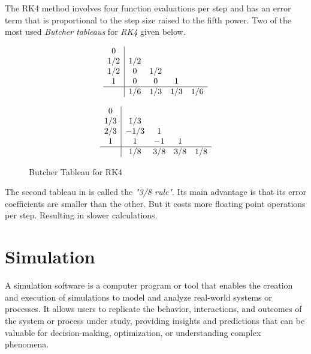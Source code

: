 \documentclass[a4paper,oneside,12pt]{report}
\numberwithin{equation}{chapter}
\begin{document}
The RK4 method involves four function evaluations per step and has an error term that is proportional to the step size raised to the fifth power.
Two of the most used \textit{Butcher tableaus} for \textit{RK4} given below.
\begin{figure}[h!]
    \centering
    \begin{subfigure}{.5\textwidth}
        \[ 
        \begin{array} 
            {c|cccc}
            0\\
            1/2 & 1/2 \\
            1/2 & 0 & 1/2 \\
            1   & 0 & 0 & 1\\
            \hline
            & 1/6 & 1/3 & 1/3 & 1/6
        \end{array}
        \]  
    \end{subfigure}%
    \begin{subfigure}{.5\textwidth}
        \[ 
        \begin{array} 
            {c|cccc}
            0\\
            1/3 & 1/3 \\
            2/3 & -1/3 & 1 \\
            1   & 1 & -1 & 1\\
            \hline
            & 1/8 & 3/8 & 3/8 & 1/8
        \end{array}
        \]  
    \end{subfigure}
    \caption{Butcher Tableau for RK4}
    \label{fig:Butcher-RK4}
\end{figure}
The second tableau in  is called the \textit{"3/8 rule"}. Its main advantage is that its error coefficients are smaller than the other. But it costs more floating point operations per step. 
Resulting in slower calculations. 



\newpage



\section{Simulation}


A simulation software is a computer program or tool that enables the creation and execution of 
simulations to model and analyze real-world systems or processes. 
It allows users to replicate the behavior, interactions, and outcomes of the system or process under study, 
providing insights and predictions that can be valuable for decision-making, optimization, or understanding complex phenomena.
\end{document}
